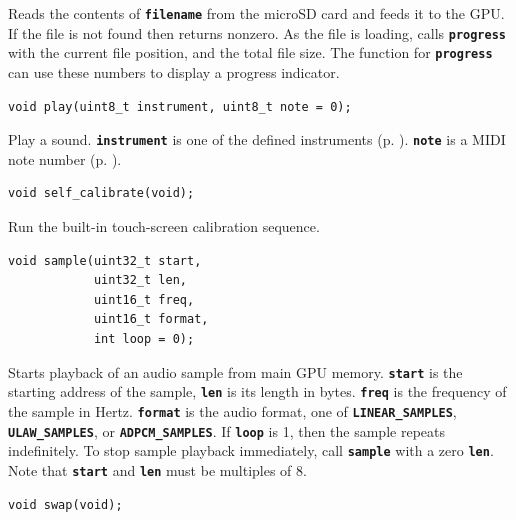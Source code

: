 \documentclass[10pt]{book}
\newcommand{\mach}[1]{\texttt{\textbf{#1}}}
\begin{document}
\begin{CJK}{UTF8}{gkai}
Reads the contents of \mach{filename} from the microSD card and
feeds it to the GPU.
If the file is not found then returns nonzero.
As the file is loading, calls \mach{progress} with the current file position,
and the total file size.
The function for \mach{progress} can use these numbers to display a progress indicator.


\begin{framed}
\begin{verbatim}
void play(uint8_t instrument, uint8_t note = 0);
\end{verbatim}
\end{framed}

Play a sound. \mach{instrument} is one of the defined instruments (p. \pageref{instruments}).
\mach{note} is a MIDI note number (p. \pageref{MIDI}).


\begin{framed}
\begin{verbatim}
void self_calibrate(void);
\end{verbatim}
\end{framed}

Run the built-in touch-screen calibration sequence.


\begin{framed}
\begin{verbatim}
void sample(uint32_t start,
            uint32_t len,
            uint16_t freq,
            uint16_t format,
            int loop = 0);
\end{verbatim}
\end{framed}

Starts playback of an audio sample from main GPU memory.
\mach{start} is the starting address of the sample,
\mach{len} is its length in bytes.
\mach{freq} is the frequency of the sample in Hertz.
\mach{format} is the audio format, one of
\mach{LINEAR\_SAMPLES},
\mach{ULAW\_SAMPLES}, or
\mach{ADPCM\_SAMPLES}.
If \mach{loop} is 1, then the sample repeats indefinitely.
To stop sample playback immediately, call \mach{sample} with a zero \mach{len}.
Note that \mach{start} and \mach{len} must be multiples of 8.


\begin{framed}
\begin{verbatim}
void swap(void);
\end{verbatim}
\end{framed}


\end{CJK}
\end{document}
